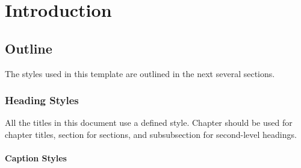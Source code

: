 \chapter{Introduction}


\section{Outline}

The styles used in this template are outlined in the next several sections.

\subsection{Heading Styles}

All the titles in this document use a defined style. Chapter should be used for chapter titles,
section for sections, and subsubsection for second-level headings.

\subsubsection{Caption Styles}
